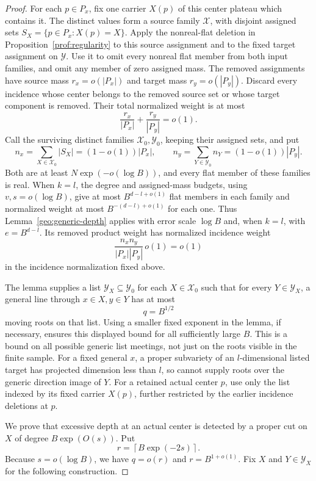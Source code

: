 \begin{proof}
For each $p\in P_x$, fix one carrier $X(p)$ of this center plateau
which contains it. The distinct values form a source family
$\mathcal X$, with disjoint assigned sets
$S_X=\{p\in P_x:X(p)=X\}$. Apply the nonreal-flat deletion in
Proposition~\ref{prof:regularity} to this source assignment and to
the fixed target assignment on $\mathcal Y$. Use it to omit every
nonreal flat member from both input families, and omit any member
of zero assigned mass. The removed assignments have source mass
$r_x=o(|P_x|)$ and target mass $r_y=o(|P_y|)$. Discard every incidence whose center belongs to the
removed source set or whose target component is removed. Their
total normalized weight is at most
\[
 \frac{r_x}{|P_x|}+\frac{r_y}{|P_y|}=o(1).
\]
Call the surviving distinct families $\mathcal X_0,\mathcal Y_0$,
keeping their assigned sets, and put
\[
 n_x=\sum_{X\in\mathcal X_0}|S_X|=(1-o(1))|P_x|,
 \qquad
 n_y=\sum_{Y\in\mathcal Y_0}n_Y=(1-o(1))|P_y|.
\]
Both are at least $N\exp(-o(\log B))$, and every flat member of
these families is real. When $k=l$, the degree and assigned-mass
budgets, using $v,s=o(\log B)$, give at most $B^{d-l+o(1)}$ flat
members in each family and normalized weight at most
$B^{-(d-l)+o(1)}$ for each one. Thus
Lemma~\ref{geo:generic-depth} applies with error scale $\log B$ and,
when $k=l$, with $e=B^{d-l}$. Its removed product weight has
normalized incidence weight
\[
 \frac{n_xn_y}{|P_x||P_y|}\,o(1)=o(1)
\]
in the incidence normalization fixed above.

The lemma supplies a list $\mathcal Y_X\subseteq\mathcal Y_0$ for
each $X\in\mathcal X_0$ such that for every $Y\in\mathcal Y_X$,
a general line through $x\in X,y\in Y$ has
at most
\[
 q=B^{1/2}
\]
moving roots on that list. Using a smaller fixed exponent in the
lemma, if necessary, ensures this displayed bound for all sufficiently
large $B$. This is a bound on all possible generic list meetings,
not just on the roots visible in the finite sample. For a fixed
general $x$, a proper subvariety of an $l$-dimensional listed target
has projected dimension less than $l$, so cannot supply roots over
the generic direction image of $Y$.
For a retained actual center $p$, use only the list indexed by its
fixed carrier $X(p)$, further restricted by the earlier incidence
deletions at $p$.

We prove that excessive depth at an actual center is detected by a
proper cut on $X$ of degree $B\exp(O(s))$. Put
\[
 r=\left\lceil B\exp(-2s)\right\rceil.
\]
Because $s=o(\log B)$, we have $q=o(r)$ and $r=B^{1+o(1)}$.
Fix $X$ and $Y\in\mathcal Y_X$ for the following construction.


\end{proof}
